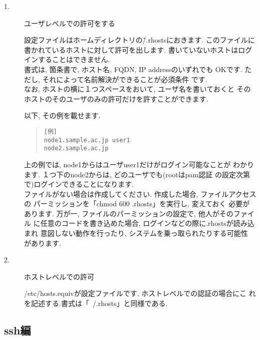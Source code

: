 \documentclass[a4paper,titlepage]{jreport}
\begin{document}
\begin{description}
\item[1.] ユーザレベルでの許可をする

          設定ファイルはホームディレクトリの\~/.rhostsにおきます.
          このファイルに書かれているホストに対して許可を出します. 
          書いていないホストはログインすることはできません.\\

          書式は, 箇条書で, ホスト名, FQDN, IP addressのいずれでも
          OKです. ただし, それによって名前解決ができることが必須条件
          です.\\
          
          なお, ホストの横に１つスペースをおいて, ユーザ名を書いておくと
          そのホストのそのユーザのみの許可だけを許すことができます.

          以下, その例を載せます.

\begin{quote}
\begin{screen}
\begin{verbatim}
[例] 
node1.sample.ac.jp user1
node2.sample.ac.jp
\end{verbatim}
\end{screen}
\end{quote}

          上の例では, node1からはユーザuser1だけがログイン可能なことが
          わかります. １つ下のnode2からは, どのユーザでも(rootはpam認証
          の設定次第で)ログインできることになります.\\

          ファイルがない場合は作成してください. 作成した場合, ファイルアクセスの
          パーミッションを「chmod 600 .rhosts」を実行し, 変えておく
          必要があります.
          万が一, ファイルのパーミッションの設定で, 他人がそのファイル
          に任意のコードを書き込めた場合, ログインなどの際に.rhostsが読み込まれ
          意図しない動作を行ったり, システムを乗っ取られたりする可能性
          があります.

\item[2.] ホストレベルでの許可

          /etc/hosts.equivが設定ファイルです. ホストレベルでの認証の場合にこ
          れを記述する.書式は「~/.rhosts」と同様である.

\end{description}

\subsection{ssh編}
\end{document}
